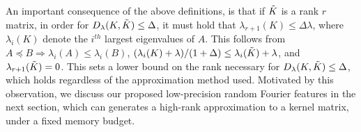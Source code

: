 An important consequence of the above definitions, is that if $\tilde{K}$ is a rank $r$ matrix, 
in order for $D_{\lambda}(K,\tilde{K}) \leq \Delta$, it must hold that $\lambda_{r+1}(K) \leq \Delta \lambda$, where $\lambda_i(K)$ denote the $i^{th}$ largest eigenvalues of $A$.  This follows from $A\preceq B \Rightarrow \lambda_i(A) \leq \lambda_i(B)$, $(\lambda_i(K) + \lambda)/(1+\Delta) \leq \lambda_i(\tilde{K}) + \lambda$, and $\lambda_{r+1}(\tilde{K}) = 0$.  This sets a lower bound on the rank necessary for $D_{\lambda}(K,\tilde{K}) \leq \Delta$, which holds regardless of the approximation method used.  
Motivated by this observation, we discuss our proposed low-precision random Fourier features in the next section, which can generates a high-rank approximation to a kernel matrix, under a fixed memory budget.

